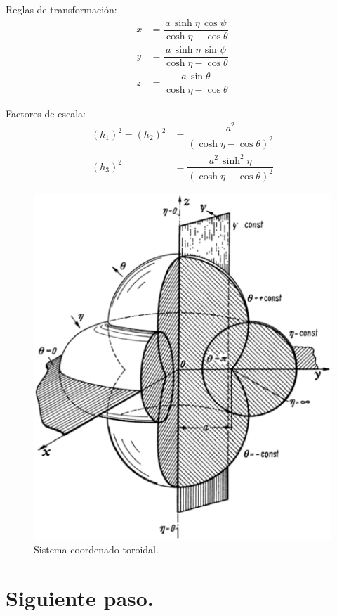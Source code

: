 Reglas de transformación:
\begin{align*}
x &= \dfrac{a \, \sinh \eta \, \cos \psi}{\cosh \eta - \cos \theta} \\[0.5em]
y &= \dfrac{a \, \sinh \eta \, \sin \psi}{\cosh \eta - \cos \theta} \\[0.5em]
z &= \dfrac{a \, \sin \theta}{\cosh \eta - \cos \theta}
\end{align*}

Factores de escala:
\begin{align*}
(h_{1})^{2} = (h_{2})^{2} &= \dfrac{a^{2}}{(\cosh \eta - \cos \theta)^{2}} \\[0.5em]
(h_{3})^{2} &= \dfrac{a^{2} \, \sinh^{2} \eta}{(\cosh \eta - \cos \theta)^{2}}
\end{align*}

\begin{figure}[H]
    \centering
    \includegraphics[scale=0.4]{Imagenes/Sistema_Toroidal.eps}
    \caption{Sistema coordenado toroidal.}
\end{figure}

\section{Siguiente paso.}

